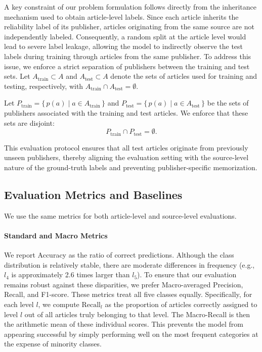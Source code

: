\documentclass[journal]{IEEEtran}
\begin{document}
A key constraint of our problem formulation follows directly from the inheritance mechanism used to obtain article-level labels. Since each article inherits the reliability label of its publisher, articles originating from the same source are not independently labeled. Consequently, a random split at the article level would lead to severe label leakage, allowing the model to indirectly observe the test labels during training through articles from the same publisher. To address this issue, we enforce a strict separation of publishers between the training and test sets.
Let \(A_{\text{train}} \subset A\) and \(A_{\text{test}} \subset A\) denote
the sets of articles used for training and testing, respectively, with
\(A_{\text{train}} \cap A_{\text{test}} = \emptyset\).

Let \(P_{\text{train}} = \{\, p(a) \mid a \in A_{\text{train}} \,\}\) and
\(P_{\text{test}} = \{\, p(a) \mid a \in A_{\text{test}} \,\}\) be the sets
of publishers associated with the training and test articles.
We enforce that these sets are disjoint:
\begin{equation}\label{eq:publisher_disjoint}
P_{\text{train}} \cap P_{\text{test}} = \emptyset .
\end{equation}

This evaluation protocol ensures that all test articles originate from previously unseen publishers, thereby aligning the evaluation setting with the source-level nature of the ground-truth labels and preventing publisher-specific memorization.

\subsection{Evaluation Metrics and Baselines}\label{subsection:metrics}
We use the same metrics for both article-level and source-level evaluations.

\paragraph{Standard and Macro Metrics} 
We report Accuracy as the ratio of correct predictions. Although the class distribution is relatively stable, there are moderate differences in frequency (e.g., $l_4$ is approximately 2.6 times larger than $l_5$). To ensure that our evaluation remains robust against these disparities, we prefer Macro-averaged Precision, Recall, and F1-score. These metrics treat all five classes equally. Specifically, for each level $l$, we compute $\text{Recall}_l$ as the proportion of articles correctly assigned to level $l$ out of all articles truly belonging to that level. The Macro-Recall is then the arithmetic mean of these individual scores. This prevents the model from appearing successful by simply performing well on the most frequent categories at the expense of minority classes.
\end{document}

